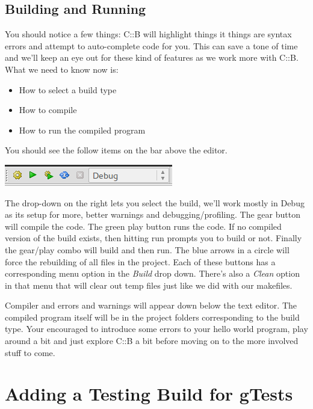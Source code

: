 \documentclass[10pt]{article}
\begin{document}
\subsection{Building and Running}

You should notice a few things: C::B will highlight things it things are syntax errors and attempt to auto-complete code for you. This can save a tone of time and we'll keep an eye out for these kind of features as we work more with C::B. What we need to know now is:
\begin{itemize}
\item How to select a build type
\item How to compile
\item How to run the compiled program
\end{itemize}

You should see the follow items on the bar above the editor.
\vspace{.1in}
\begin{center}
\includegraphics[scale=.5]{CB_BuildBar.png}
\end{center}
\vspace{.1in}

The drop-down on the right lets you select the build, we'll work mostly in Debug as its setup for more, better warnings and debugging/profiling. The gear button will compile the code. The green play button runs the code. If no compiled version of the build exists, then hitting run prompts you to build or not. Finally the gear/play combo will build and then run. The blue arrows in a circle will force the rebuilding of all files in the project. Each of these buttons has a corresponding menu option in the \textit{Build} drop down. There's also a \textit{Clean} option in that menu that will clear out temp files just like we did with our makefiles.

Compiler and errors and warnings will appear down below the text editor. The compiled program itself will be in the project folders corresponding to the build type. Your encouraged to introduce some errors to your hello world program, play around a bit and just explore C::B a bit before moving on to the more involved stuff to come.   

\newpage
\section{Adding a Testing Build for gTests}
\end{document}

